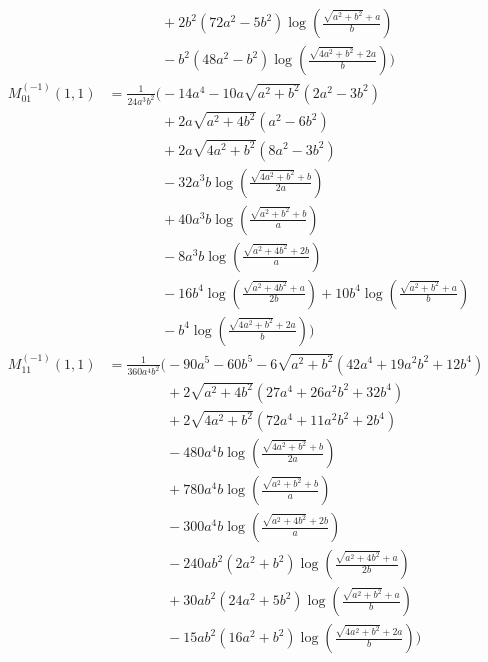 \begin{align*}
&\phantom{{}=\frac{1}{24 a^{3} b^{2}}\Bigg(}+ 2 b^{2} \left(72 a^{2} - 5 b^{2}\right) \log\left(\frac{\sqrt{a^{2} + b^{2}} + a}{b}\right)\\
&\phantom{{}=\frac{1}{24 a^{3} b^{2}}\Bigg(}- b^{2} \left(48 a^{2} - b^{2}\right) \log\left(\frac{\sqrt{4 a^{2} + b^{2}} + 2 a}{b}\right)\Bigg)\\[1.2ex]
M^{(-1)}_{01}(1,1) &= \frac{1}{24 a^{3} b^{2}}\Bigg(- 14 a^{4} - 10 a \sqrt{a^{2} + b^{2}}\left(2 a^{2} - 3 b^{2}\right)\\
&\phantom{{}=\frac{1}{24 a^{3} b^{2}}\Bigg(}+ 2 a \sqrt{a^{2} + 4 b^{2}}\left(a^{2} - 6 b^{2}\right)\\
&\phantom{{}=\frac{1}{24 a^{3} b^{2}}\Bigg(}+ 2 a \sqrt{4 a^{2} + b^{2}}\left(8 a^{2} - 3 b^{2}\right)\\
&\phantom{{}=\frac{1}{24 a^{3} b^{2}}\Bigg(}- 32 a^{3} b \log\left(\frac{\sqrt{4 a^{2} + b^{2}} + b}{2 a}\right)\\
&\phantom{{}=\frac{1}{24 a^{3} b^{2}}\Bigg(}+ 40 a^{3} b \log\left(\frac{\sqrt{a^{2} + b^{2}} + b}{a}\right)\\
&\phantom{{}=\frac{1}{24 a^{3} b^{2}}\Bigg(}- 8 a^{3} b \log\left(\frac{\sqrt{a^{2} + 4 b^{2}} + 2 b}{a}\right)\\
&\phantom{{}=\frac{1}{24 a^{3} b^{2}}\Bigg(}- 16 b^{4} \log\left(\frac{\sqrt{a^{2} + 4 b^{2}} + a}{2 b}\right) + 10 b^{4} \log\left(\frac{\sqrt{a^{2} + b^{2}} + a}{b}\right)\\
&\phantom{{}=\frac{1}{24 a^{3} b^{2}}\Bigg(}- b^{4} \log\left(\frac{\sqrt{4 a^{2} + b^{2}} + 2 a}{b}\right)\Bigg)\\[1.2ex]
M^{(-1)}_{11}(1,1) &= \frac{1}{360 a^{4} b^{2}}\Bigg(- 90 a^{5} - 60 b^{5} - 6 \sqrt{a^{2} + b^{2}}\left(42 a^{4} + 19 a^{2} b^{2} + 12 b^{4}\right)\\
&\phantom{{}=\frac{1}{360 a^{4} b^{2}}\Bigg(}+ 2 \sqrt{a^{2} + 4 b^{2}}\left(27 a^{4} + 26 a^{2} b^{2} + 32 b^{4}\right)\\
&\phantom{{}=\frac{1}{360 a^{4} b^{2}}\Bigg(}+ 2 \sqrt{4 a^{2} + b^{2}}\left(72 a^{4} + 11 a^{2} b^{2} + 2 b^{4}\right)\\
&\phantom{{}=\frac{1}{360 a^{4} b^{2}}\Bigg(}- 480 a^{4} b \log\left(\frac{\sqrt{4 a^{2} + b^{2}} + b}{2 a}\right)\\
&\phantom{{}=\frac{1}{360 a^{4} b^{2}}\Bigg(}+ 780 a^{4} b \log\left(\frac{\sqrt{a^{2} + b^{2}} + b}{a}\right)\\
&\phantom{{}=\frac{1}{360 a^{4} b^{2}}\Bigg(}- 300 a^{4} b \log\left(\frac{\sqrt{a^{2} + 4 b^{2}} + 2 b}{a}\right)\\
&\phantom{{}=\frac{1}{360 a^{4} b^{2}}\Bigg(}- 240 a b^{2} \left(2 a^{2} + b^{2}\right) \log\left(\frac{\sqrt{a^{2} + 4 b^{2}} + a}{2 b}\right)\\
&\phantom{{}=\frac{1}{360 a^{4} b^{2}}\Bigg(}+ 30 a b^{2} \left(24 a^{2} + 5 b^{2}\right) \log\left(\frac{\sqrt{a^{2} + b^{2}} + a}{b}\right)\\
&\phantom{{}=\frac{1}{360 a^{4} b^{2}}\Bigg(}- 15 a b^{2} \left(16 a^{2} + b^{2}\right) \log\left(\frac{\sqrt{4 a^{2} + b^{2}} + 2 a}{b}\right)\Bigg)
\end{align*}
